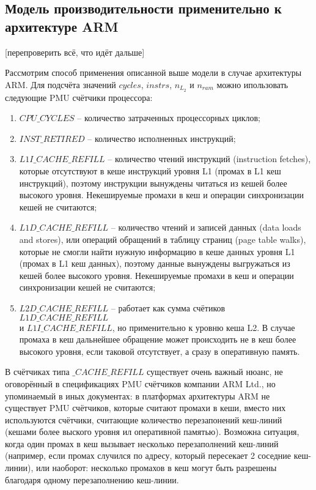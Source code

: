 \subsection{Модель производительности применительно к архитектуре ARM}

    [перепроверить всё, что идёт дальше]

    Рассмотрим способ применения описанной выше модели в случае архитектуры ARM.
    Для подсчёта значений $cycles$, $instrs$, $n_{L_2}$ и $n_{ram}$ можно ипользовать
    следующие PMU счётчики процессора:
    \begin{enumerate}
        \item $CPU\_CYCLES$ -- количество затраченных процессорных циклов;
        \item $INST\_RETIRED$ -- количество исполненных инструкций;
        \item $L1I\_CACHE\_REFILL$ -- количество чтений инструкций (instruction fetches),
        которые отсутствуют в кеше инструкций уровня L1 (промах в L1 кеш инструкций),
        поэтому инструкции вынуждены читаться из кешей более высокого уровня.
        Некешируемые промахи в кеш и операции синхронизации кешей не считаются;
        \item $L1D\_CACHE\_REFILL$ -- количество чтений и записей данных (data loads and stores),
        или операций обращений в таблицу страниц (page table walks), которые не смогли
        найти нужную информацию в кеше данных уровня L1 (промах в L1 кеш данных),
        поэтому данные вынуждены выгружаться из кешей более высокого уровня.
        Некешируемые промахи в кеш и операции синхронизации кешей не считаются;
        \item $L2D\_CACHE\_REFILL$ -- работает как сумма счётиков $L1D\_CACHE\_REFILL$ \\ и
        $L1I\_CACHE\_REFILL$, но применительно к уровню кеша L2. В случае промаха в кеш дальнейшее
        обращение может происходить не в кеш более высокого уровня, если таковой отсутствует,
        а сразу в оперативную память.
    \end{enumerate}

    В счётчиках типа $\_CACHE\_REFILL$ существует очень важный нюанс, не оговорённый
    в спецификациях PMU счётчиков компании ARM Ltd.,
    но упоминаемый в иных документах: в платформах архитектуры ARM не существует PMU
    счётчиков, которые считают промахи в кеши, вместо них используются счётчики, считающие
    количество перезапонений кеш-линий (кешами более выского уровня ил оперативной памятью).
    Возможна ситуация, когда один промах в кеш вызывает
    несколько перезаполнений кеш-линий (например, если промах случился по адресу,
    который пересекает 2 соседние кеш-линии), или наоборот: несколько промахов
    в кеш могут быть разрешены благодаря одному перезаполнению кеш-линии.

